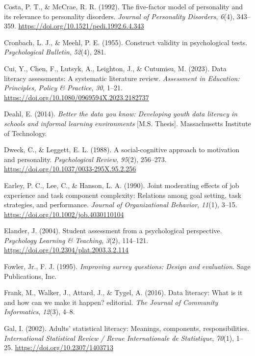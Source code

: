 \documentclass[
  12pt,
  a4paper,
  twoside]{article}
\newlength{\cslhangindent}
\newenvironment{CSLReferences}[2] %
 {\begin{list}{}{%
  \setlength{\itemindent}{0pt}
  \setlength{\leftmargin}{0pt}
  \setlength{\parsep}{0pt}
  \ifodd #1
   \setlength{\leftmargin}{\cslhangindent}
   \setlength{\itemindent}{-1\cslhangindent}
  \fi
  \setlength{\itemsep}{#2\baselineskip}}}
 {\end{list}}
\begin{document}
\begin{CSLReferences}{1}{0}
Costa, P. T., \& McCrae, R. R. (1992). The five-factor model of personality and its relevance to personality disorders. \emph{Journal of Personality Disorders}, \emph{6}(4), 343--359. \url{https://doi.org/10.1521/pedi.1992.6.4.343}

Cronbach, L. J., \& Meehl, P. E. (1955). Construct validity in psychological tests. \emph{Psychological Bulletin}, \emph{52}(4), 281.

Cui, Y., Chen, F., Lutsyk, A., Leighton, J., \& Cutumisu, M. (2023). Data literacy assessments: A systematic literature review. \emph{Assessment in Education: Principles, Policy \& Practice}, \emph{30}, 1--21. \url{https://doi.org/10.1080/0969594X.2023.2182737}

Deahl, E. (2014). \emph{Better the data you know: Developing youth data literacy in schools and informal learning environments} {[}M.S. Thesis{]}. Massachusetts Institute of Technology.

Dweck, C., \& Leggett, E. L. (1988). A social-cognitive approach to motivation and personality. \emph{Psychological Review}, \emph{95}(2), 256--273. \url{https://doi.org/10.1037/0033-295X.95.2.256}

Earley, P. C., Lee, C., \& Hanson, L. A. (1990). Joint moderating effects of job experience and task component complexity: Relations among goal setting, task strategies, and performance. \emph{Journal of Organizational Behavior}, \emph{11}(1), 3--15. \url{https://doi.org/10.1002/job.4030110104}

Elander, J. (2004). Student assessment from a psychological perspective. \emph{Psychology Learning \& Teaching}, \emph{3}(2), 114--121. \url{https://doi.org/10.2304/plat.2003.3.2.114}

Fowler, Jr., F. J. (1995). \emph{Improving survey questions: Design and evaluation}. Sage Publications, Inc.

Frank, M., Walker, J., Attard, J., \& Tygel, A. (2016). Data literacy: What is it and how can we make it happen? editorial. \emph{The Journal of Community Informatics}, \emph{12}(3), 4--8.

Gal, I. (2002). Adults' statistical literacy: Meanings, components, responsibilities. \emph{International Statistical Review / Revue Internationale de Statistique}, \emph{70}(1), 1--25. \url{https://doi.org/10.2307/1403713}


\end{CSLReferences}
\end{document}
